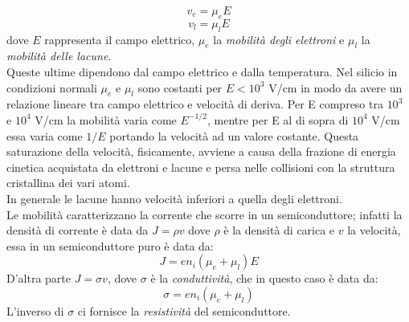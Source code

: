 \documentclass[12pt, letterpaper]{book}
\begin{document}
$$v_e=\mu_eE$$
$$v_l=\mu_l E$$
dove $E$ rappresenta il campo elettrico, $\mu_e$
la \textit{mobilità degli elettroni} e $\mu_l$ la \textit{mobilità delle lacune}.\\
Queste ultime dipendono dal campo elettrico e dalla temperatura. Nel silicio in condizioni normali
$\mu_e$ e $\mu_l$ sono costanti per $E<10^3$ V/cm in modo da avere un relazione lineare tra campo elettrico
e velocità di deriva. Per E compreso tra $10^3$ e $10^4$ V/cm la mobilità varia come $E^{-1/2}$, mentre per E al di sopra di $10^4$ V/cm essa varia come $1/E$ portando la velocità ad un valore costante. Questa saturazione della velocità, fisicamente, avviene a causa della frazione di energia cinetica acquistata da elettroni e lacune e persa nelle collisioni con la struttura cristallina dei vari atomi.\\
In generale le lacune hanno velocità inferiori a quella degli elettroni.\\ 
Le mobilità caratterizzano la corrente che scorre in un semiconduttore; infatti la densità di corrente è data da $J=\rho v$ dove $\rho$ è la densità di carica e $v$ la velocità, essa in un semiconduttore puro è data da:
$$J=en_i(\mu_e+\mu_l)E$$
D'altra parte $J=\sigma v$, dove $\sigma$ è la \textit{conduttività}, che in questo caso è data da:
$$\sigma=en_i(\mu_e+\mu_l)$$
L'inverso di $\sigma$ ci fornisce la \textit{resistività} del semiconduttore.
\end{document}

